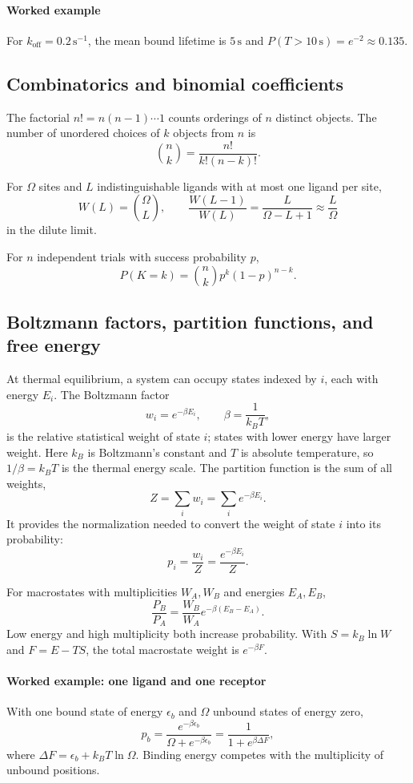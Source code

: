 \paragraph{Worked example}
For $k_{\mathrm{off}}=0.2\,\mathrm{s}^{-1}$, the mean bound lifetime is $5\,\mathrm{s}$ and $P(T>10\,\mathrm{s})=e^{-2}\approx0.135$.


\subsection{Combinatorics and binomial coefficients}
\label{math:combinatorics}

The factorial $n!=n(n-1)\cdots1$ counts orderings of $n$ distinct objects.
The number of unordered choices of $k$ objects from $n$ is
\[
    \binom{n}{k}=\frac{n!}{k!(n-k)!}.
\]

For $\Omega$ sites and $L$ indistinguishable ligands with at most one ligand per site,
\[
    W(L)=\binom{\Omega}{L}, \qquad \frac{W(L-1)}{W(L)}=\frac{L}{\Omega-L+1}\approx\frac{L}{\Omega}
\]
in the dilute limit.

For $n$ independent trials with success probability $p$,
\[
    P(K=k)=\binom{n}{k}p^k(1-p)^{n-k}.
\]


\subsection{Boltzmann factors, partition functions, and free energy}
\label{math:boltzmann}

At thermal equilibrium, a system can occupy states indexed by $i$, each with energy $E_i$.
The Boltzmann factor
\[
    w_i=e^{-\beta E_i}, \qquad \beta=\frac{1}{k_BT},
\]
is the relative statistical weight of state $i$; states with lower energy have larger weight.
Here $k_B$ is Boltzmann's constant and $T$ is absolute temperature, so $1/\beta=k_BT$ is the thermal energy scale.
The partition function is the sum of all weights,
\[
    Z=\sum_i w_i=\sum_i e^{-\beta E_i}.
\]
It provides the normalization needed to convert the weight of state $i$ into its probability:
\[
    p_i=\frac{w_i}{Z}=\frac{e^{-\beta E_i}}{Z}.
\]

For macrostates with multiplicities $W_A,W_B$ and energies $E_A,E_B$,
\[
    \frac{P_B}{P_A}=\frac{W_B}{W_A}e^{-\beta(E_B-E_A)}.
\]
Low energy and high multiplicity both increase probability.
With $S=k_B\ln W$ and $F=E-TS$, the total macrostate weight is $e^{-\beta F}$.

\paragraph{Worked example: one ligand and one receptor}
With one bound state of energy $\epsilon_b$ and $\Omega$ unbound states of energy zero,
\[
    p_b=\frac{e^{-\beta\epsilon_b}}{\Omega+e^{-\beta\epsilon_b}}=\frac{1}{1+e^{\beta\Delta F}},
\]
where $\Delta F=\epsilon_b+k_BT\ln\Omega$.
Binding energy competes with the multiplicity of unbound positions.


